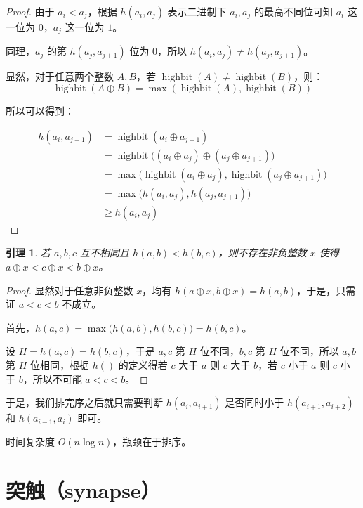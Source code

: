 \documentclass[12pt]{article}
\newtheorem{lem}{引理}[section]
\newcommand{\fancyheadRightText}{}
\begin{document}
\begin{proof}
    由于 $a_i<a_j$，根据 $h(a_i,a_j)$ 表示二进制下 $a_i,a_j$ 的最高不同位可知 $a_i$ 这一位为 $0$，$a_j$ 这一位为 $1$。

    同理，$a_j$ 的第 $h(a_j,a_{j+1})$ 位为 $0$，所以 $h(a_i,a_j)\neq h(a_j,a_{j+1})$。

    显然，对于任意两个整数 $A, B$，若 $\operatorname{highbit}(A) \neq \operatorname{highbit}(B)$，则：
$$\operatorname{highbit}(A \oplus B) = \max(\operatorname{highbit}(A), \operatorname{highbit}(B))$$

    所以可以得到：

    $$
    \begin{aligned}
h(a_i, a_{j+1}) &= \operatorname{highbit}(a_i \oplus a_{j+1}) \\
&= \operatorname{highbit}\big((a_i \oplus a_j) \oplus (a_j \oplus a_{j+1})\big) \\
&= \max\big(\operatorname{highbit}(a_i \oplus a_j), \operatorname{highbit}(a_j \oplus a_{j+1})\big) \\
&= \max\big(h(a_i, a_j), h(a_j, a_{j+1})\big) \\
&\ge h(a_i, a_j)
    \end{aligned}
    $$

    
    
\end{proof}

\begin{lem}
    若 $a,b,c$ 互不相同且 $h(a,b)<h(b,c)$，则不存在非负整数 $x$ 使得 $a\oplus x<c\oplus x<b\oplus x$。
\end{lem}

\begin{proof}
    显然对于任意非负整数 $x$，均有 $h(a\oplus x,b\oplus x)=h(a,b)$，于是，只需证 $a<c<b$ 不成立。

    首先，$h(a,c)=\max\big(h(a,b),h(b,c)\big)=h(b,c)$。

    设 $H=h(a,c)=h(b,c)$，于是 $a,c$ 第 $H$ 位不同，$b,c$ 第 $H$ 位不同，所以 $a,b$ 第 $H$ 位相同，根据 $h()$ 的定义得若 $c$ 大于 $a$ 则 $c$ 大于 $b$，若 $c$ 小于 $a$ 则 $c$ 小于 $b$，所以不可能 $a<c<b$。
\end{proof}

于是，我们排完序之后就只需要判断 $h(a_i,a_{i+1})$ 是否同时小于 $h(a_{i+1},a_{i+2})$ 和 $h(a_{i-1},a_i)$ 即可。

时间复杂度 $O(n\log n)$，瓶颈在于排序。

\newpage

\section{突触（synapse）}
\fancyhead[R]{\footnotesize \fancyheadRightText\quad 突触（synapse）}
\end{document}
